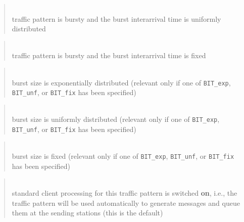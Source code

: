 \begin{quote}
\noindent{}\\ \hspace{0in}
traffic pattern is bursty and the burst interarrival time is uniformly
distributed
\end{quote}

\begin{quote}
\noindent{}\\ \hspace{0in}
traffic pattern is bursty and the burst interarrival time is fixed
\end{quote}

\begin{quote}
\noindent{}\\ \hspace{0in}
burst size is exponentially distributed
(relevant only if one of {\tt BIT\_exp}, {\tt BIT\_unf}, or {\tt BIT\_fix}
has been specified)
\end{quote}

\begin{quote}
\noindent{}\\ \hspace{0in}
burst size is uniformly distributed
(relevant only if one of {\tt BIT\_exp}, {\tt BIT\_unf}, or {\tt BIT\_fix}
has been specified)
\end{quote}

\begin{quote}
\noindent{}\\ \hspace{0in}
burst size is fixed
(relevant only if one of {\tt BIT\_exp}, {\tt BIT\_unf}, or {\tt BIT\_fix}
has been specified)
\end{quote}

\begin{quote}
\noindent{}\\ \hspace{0in}
standard client processing for this traffic pattern is switched {\bf on},
i.e., the traffic pattern will be used automatically to generate
messages and queue them at the sending stations (this is the default)
\end{quote}

